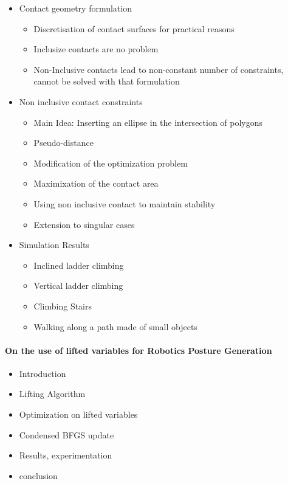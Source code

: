 \documentclass{article}
\begin{document}
\begin{itemize}
  \item Contact geometry formulation
    \begin{itemize}
      \item Discretisation of contact surfaces for practical reasons
      \item Inclusize contacts are no problem
      \item Non-Inclusive contacts lead to non-constant number of constraints, cannot be solved with that formulation
    \end{itemize}
  \item{Non inclusive contact constraints}
    \begin{itemize}
      \item {Main Idea: Inserting an ellipse in the intersection of polygons}
      \item {Pseudo-distance}
      \item {Modification of the optimization problem}
      \item {Maximixation of the contact area}
      \item {Using non inclusive contact to maintain stability}
      \item {Extension to singular cases}
    \end{itemize}
  \item{Simulation Results}
    \begin{itemize}
      \item{Inclined ladder climbing}
      \item{Vertical ladder climbing}
      \item{Climbing Stairs}
      \item{Walking along a path made of small objects}
    \end{itemize}
\end{itemize}


\paragraph{On the use of lifted variables for Robotics Posture Generation}

\begin{itemize}
  \item {Introduction}
  \item {Lifting Algorithm}
  \item {Optimization on lifted variables}
  \item {Condensed BFGS update}
  \item {Results, experimentation}
  \item {conclusion}
\end{itemize}
\end{document}

